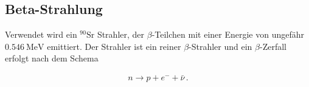 \subsection{Beta-Strahlung}

Verwendet wird ein $^90\text{Sr}$ Strahler, der $\beta$-Teilchen mit einer Energie 
von ungefähr $\SI{0.546}{\mega\electronvolt}$ emittiert. Der Strahler ist ein 
reiner $\beta$-Strahler und ein $\beta$-Zerfall erfolgt nach dem Schema

\begin{align*}
    n \to p + e^{-} + \bar{\nu} \, .
\end{align*}